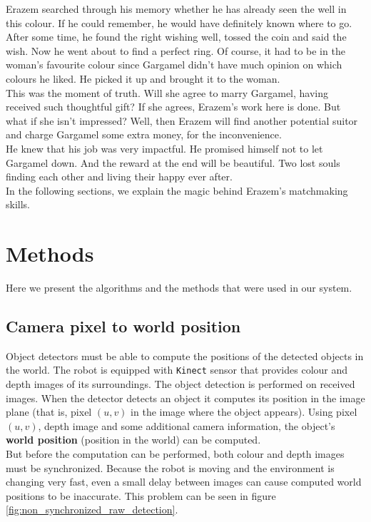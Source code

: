 \documentclass[12pt,a4paper]{article}
\begin{document}
	Erazem searched through his memory whether he has already seen the well in this colour. If he could remember, he would have definitely known where to go. After some time, he found the right wishing well, tossed the coin and said the wish. Now he went about to find a perfect ring. Of course, it had to be in the woman's favourite colour since Gargamel didn't have much opinion on which colours he liked. He picked it up and brought it to the woman. \\
	
	This was the moment of truth. Will she agree to marry Gargamel, having received such thoughtful gift? If she agrees, Erazem's work here is done. But what if she isn't impressed? Well, then Erazem will find another potential suitor and charge Gargamel some extra money, for the inconvenience. \\

	He knew that his job was very impactful. He promised himself not to let Gargamel down. And the reward at the end will be beautiful. Two lost souls finding each other and living their happy ever after. \\

	In the following sections, we explain the magic behind Erazem's matchmaking skills. \\
	
	\section{Methods} \label{methods}
	Here we present the algorithms and the methods that were used in our system.
	
	\subsection{Camera pixel to world position} \label{pixel_to_world}
	Object detectors must be able to compute the positions of the detected objects in the world. The robot is equipped with \texttt{Kinect} sensor that provides colour and depth images of its surroundings. The object detection is performed on received images. When the detector detects an object it computes its position in the image plane (that is, pixel $(u, v)$ in the image where the object appears). Using pixel $(u, v)$, depth image and some additional camera information, the object's \textbf{world position} (position in the world) can be computed. \\
	
	But before the computation can be performed, both colour and depth images must be synchronized. Because the robot is moving and the environment is changing very fast, even a small delay between images can cause computed world positions to be inaccurate. This problem can be seen in figure \ref{fig:non_synchronized_raw_detection}. \\ 
	
\end{document}
